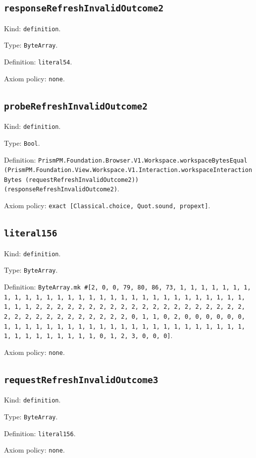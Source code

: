 \documentclass[11pt]{article}
\begin{document}
\subsection*{\texttt{responseRefreshInvalidOutcome2}}
\noindent Kind: \texttt{definition}.\par
\noindent Type: \texttt{ByteArray}.\par
\noindent Definition: \texttt{literal54}.\par
\noindent Axiom policy: \texttt{none}.\par
\subsection*{\texttt{probeRefreshInvalidOutcome2}}
\noindent Kind: \texttt{definition}.\par
\noindent Type: \texttt{Bool}.\par
\noindent Definition: \texttt{PrismPM.Foundation.Browser.V1.Workspace.workspaceBytesEqual (PrismPM.Foundation.View.Workspace.V1.Interaction.workspaceInteractionBytes (requestRefreshInvalidOutcome2)) (responseRefreshInvalidOutcome2)}.\par
\noindent Axiom policy: \texttt{exact [Classical.choice, Quot.sound, propext]}.\par
\subsection*{\texttt{literal156}}
\noindent Kind: \texttt{definition}.\par
\noindent Type: \texttt{ByteArray}.\par
\noindent Definition: \texttt{ByteArray.mk \#[2, 0, 0, 79, 80, 86, 73, 1, 1, 1, 1, 1, 1, 1, 1, 1, 1, 1, 1, 1, 1, 1, 1, 1, 1, 1, 1, 1, 1, 1, 1, 1, 1, 1, 1, 1, 1, 1, 1, 1, 2, 2, 2, 2, 2, 2, 2, 2, 2, 2, 2, 2, 2, 2, 2, 2, 2, 2, 2, 2, 2, 2, 2, 2, 2, 2, 2, 2, 2, 2, 2, 2, 0, 1, 1, 0, 2, 0, 0, 0, 0, 0, 0, 1, 1, 1, 1, 1, 1, 1, 1, 1, 1, 1, 1, 1, 1, 1, 1, 1, 1, 1, 1, 1, 1, 1, 1, 1, 1, 1, 1, 1, 1, 1, 1, 0, 1, 2, 3, 0, 0, 0]}.\par
\noindent Axiom policy: \texttt{none}.\par
\subsection*{\texttt{requestRefreshInvalidOutcome3}}
\noindent Kind: \texttt{definition}.\par
\noindent Type: \texttt{ByteArray}.\par
\noindent Definition: \texttt{literal156}.\par
\noindent Axiom policy: \texttt{none}.\par
\end{document}
